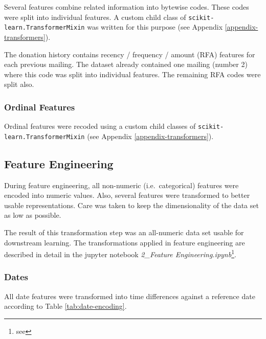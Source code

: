 \documentclass[
  11pt,
  a4paper,
  DIV=12,captions=tableheading,oneside]{scrbook}
\begin{document}
Several features combine related information into bytewise codes. These codes were split into individual features. A custom child class of \texttt{scikit-learn.TransformerMixin} was written for this purpose (see Appendix \ref{appendix-transformers}).

The donation history contains recency / frequency / amount (RFA) features for each previous mailing. The dataset already contained one mailing (number 2) where this code was split into individual features. The remaining RFA codes were split also.

\hypertarget{ordinal-features}{%
\subsubsection{Ordinal Features}\label{ordinal-features}}

Ordinal features were recoded using a custom child classes of \texttt{scikit-learn.TransformerMixin} (see Appendix \ref{appendix-transformers}).

\hypertarget{feature-engineering}{%
\subsection{Feature Engineering}\label{feature-engineering}}

During feature engineering, all non-numeric (i.e.~categorical) features were encoded into numeric values. Also, several features were transformed to better usable representations. Care was taken to keep the dimensionality of the data set as low as possible.

The result of this transformation step was an all-numeric data set usable for downstream learning. The transformations applied in feature engineering are described in detail in the jupyter notebook \emph{2\_Feature Engineering.ipynb}\footnote{see }.

\hypertarget{dates}{%
\subsubsection{Dates}\label{dates}}

All date features were transformed into time differences against a reference date according to Table \ref{tab:date-encoding}.
\end{document}
